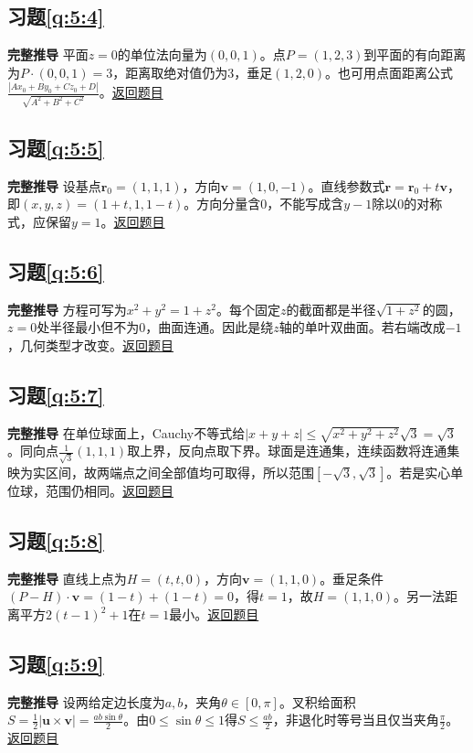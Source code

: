 \subsection*{习题\ref{q:5:4}}\label{a:5:4}\textbf{完整推导} 平面$z=0$的单位法向量为$(0,0,1)$。点$P=(1,2,3)$到平面的有向距离为$P\cdot(0,0,1)=3$，距离取绝对值仍为3，垂足$(1,2,0)$。也可用点面距离公式$\frac{|Ax_0+By_0+Cz_0+D|}{\sqrt{A^2+B^2+C^2}}$。\quad\hyperref[q:5:4]{返回题目}

\subsection*{习题\ref{q:5:5}}\label{a:5:5}\textbf{完整推导} 设基点$\bm r_0=(1,1,1)$，方向$\bm v=(1,0,-1)$。直线参数式$\bm r=\bm r_0+t\bm v$，即$(x,y,z)=(1+t,1,1-t)$。方向分量含0，不能写成含$y-1$除以0的对称式，应保留$y=1$。\quad\hyperref[q:5:5]{返回题目}

\subsection*{习题\ref{q:5:6}}\label{a:5:6}\textbf{完整推导} 方程可写为$x^2+y^2=1+z^2$。每个固定$z$的截面都是半径$\sqrt{1+z^2}$的圆，$z=0$处半径最小但不为0，曲面连通。因此是绕$z$轴的单叶双曲面。若右端改成$-1$，几何类型才改变。\quad\hyperref[q:5:6]{返回题目}

\subsection*{习题\ref{q:5:7}}\label{a:5:7}\textbf{完整推导} 在单位球面上，Cauchy不等式给$|x+y+z|\le\sqrt{x^2+y^2+z^2}\sqrt3=\sqrt3$。同向点$\frac{1}{\sqrt3}(1,1,1)$取上界，反向点取下界。球面是连通集，连续函数将连通集映为实区间，故两端点之间全部值均可取得，所以范围$[-\sqrt3,\sqrt3]$。若是实心单位球，范围仍相同。\quad\hyperref[q:5:7]{返回题目}

\subsection*{习题\ref{q:5:8}}\label{a:5:8}\textbf{完整推导} 直线上点为$H=(t,t,0)$，方向$\bm v=(1,1,0)$。垂足条件$(P-H)\cdot\bm v=(1-t)+(1-t)=0$，得$t=1$，故$H=(1,1,0)$。另一法距离平方$2(t-1)^2+1$在$t=1$最小。\quad\hyperref[q:5:8]{返回题目}

\subsection*{习题\ref{q:5:9}}\label{a:5:9}\textbf{完整推导} 设两给定边长度为$a,b$，夹角$\theta\in[0,\pi]$。叉积给面积$S=\frac12|\bm u\times\bm v|=\frac{ab\sin\theta}{2}$。由$0\le\sin\theta\le1$得$S\le \frac{ab}{2}$，非退化时等号当且仅当夹角$\frac{\pi}{2}$。\quad\hyperref[q:5:9]{返回题目}

